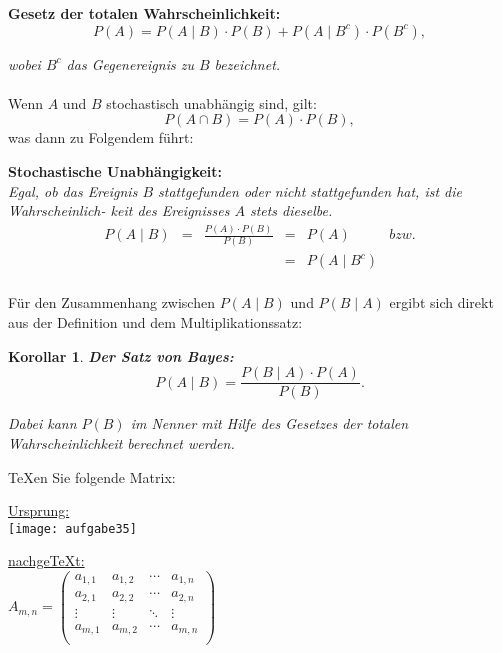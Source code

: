 \begin{mfze}{\textbf{Gesetz der totalen Wahrscheinlichkeit:}}
\begin{equation}
 P(A) = P(A \mid B) \cdot P(B) + P(A \mid B^c) \cdot P(B^c),
\end{equation}
\end{mfze}
\noindent \textit{wobei $B^c$ das Gegenereignis zu $B$ bezeichnet.}\\
\\
\indent Wenn $A$ und $B$ stochastisch unabhängig sind, gilt:
\begin{equation*}
 P(A \cap B) = P(A) \cdot P(B),
\end{equation*}
was dann zu Folgendem führt:

\begin{mfze}{\textbf{Stochastische Unabhängigkeit:}}
\\
\textit{Egal, ob das Ereignis $B$ stattgefunden oder nicht stattgefunden hat, ist die Wahrscheinlich-
keit des Ereignisses $A$ stets dieselbe.}
\\
\begin{equation}
\begin{array}{cccclc}
  P(A \mid B) & = & \frac{P(A) \cdot P(B)}{P(B)}  & = & P(A) & \textit{bzw.} \\
  & & &  = &  P(A \mid B^c) & \\
\end{array}
\end{equation}
\end{mfze}

Für den Zusammenhang zwischen $P(A \mid B)$ und $P(B \mid A)$ ergibt sich direkt aus der
Definition und dem Multiplikationssatz:

\newtheorem{cor}[mfze]{Korollar}
\begin{cor}{\textbf{Der Satz von Bayes:}}
 \begin{equation}
  P(A \mid B) = \frac{P(B \mid A) \cdot P(A)}{P(B)}.
 \end{equation}

\noindent \textit{Dabei kann $P(B)$ im Nenner mit Hilfe des Gesetzes der totalen Wahrscheinlichkeit berechnet werden.}
\end{cor}


\begin{aufgabe}
\TeX en Sie folgende Matrix:
\end{aufgabe}

\noindent \underline{Ursprung:} \\
\hspace{1cm} \texttt{[image: aufgabe35]}

\noindent \underline{nachge\TeX t:}\\ \vspace*{10cm} 
\begin{math}
 \textit{A}_{m,n} =
 \begin{pmatrix}
  a_{1,1} & a_{1,2} & \cdots & a_{1,n}\\
  a_{2,1} & a_{2,2} & \cdots & a_{2,n}\\
  \vdots  & \vdots  & \ddots & \vdots \\
  a_{m,1} & a_{m,2} & \cdots & a_{m,n}\\
 \end{pmatrix}
\end{math}
